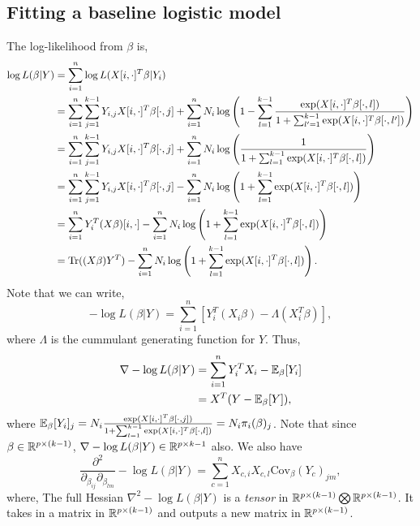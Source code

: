 \subsection{Fitting a baseline logistic model}
The log-likelihood from $\beta$ is,
\begin{align*}
    \log L(\beta|Y)&= \sum_{i=1}^n\log L(X[i,\cdot]^T\beta|Y_i)\\
    &=\sum_{i=1}^n \sum_{j=1}^{k-1} Y_{i,j}X[i,\cdot]^T\beta[\cdot,j]+\sum_{i=1}^n N_i\log\left(1- \sum_{l=1}^{k-1}\frac{\exp(X[i,\cdot]^T \beta[\cdot,l])}{1+\sum_{l'=1}^{k-1}\exp(X[i,\cdot]^T \beta[\cdot,l'])}\right)\\
    &=\sum_{i=1}^n \sum_{j=1}^{k-1} Y_{i,j}X[i,\cdot]^T\beta[\cdot,j]+\sum_{i=1}^n N_i\log\left(\frac{1}{1+\sum_{l=1}^{k-1}\exp(X[i,\cdot]^T \beta[\cdot,l])}\right)\\
    &=\sum_{i=1}^n \sum_{j=1}^{k-1} Y_{i,j}X[i,\cdot]^T\beta[\cdot,j]-\sum_{i=1}^n N_i\log\left({1+\sum_{l=1}^{k-1}\exp(X[i,\cdot]^T \beta[\cdot,l])}\right)\\
    &=\sum_{i=1}^n Y_i^T(X\beta)[i,\cdot]-\sum_{i=1}^n N_i\log\left({1+\sum_{l=1}^{k-1}\exp(X[i,\cdot]^T \beta[\cdot,l])}\right)\\
    &=\operatorname{Tr}((X\beta )Y^T)-\sum_{i=1}^n N_i\log\left({1+\sum_{l=1}^{k-1}\exp(X[i,\cdot]^T \beta[\cdot,l])}\right).
\end{align*}
Note that we can write,
\[-\log L(\beta|Y) = \sum_{i=1}^n \left[Y_i^T(X_i\beta) - \Lambda(X_i^T\beta)\right], \]
where $\Lambda$ is the cummulant generating function for $Y$. Thus,
\begin{align*}
    \nabla -\log L(\beta|Y) &= \sum_{i=1}^n Y_i^TX_i - {\mathbb{E}}_\beta[Y_i]\\
    &=X^T(Y-{\mathbb{E}}_\beta[Y]),
\end{align*}
where ${\mathbb{E}}_\beta[Y_i]_j = N_i\frac{\exp(X[i,\cdot]^T \beta[\cdot,j])}{1+\sum_{l=1}^{k-1}\exp(X[i,\cdot]^T \beta[\cdot,l])} = N_i\pi_i(\beta)_j$. Note that since $\beta \in {\mathbb R}^{p \times (k-1)}$, $\nabla - \log L(\beta|Y) \in {\mathbb R}^{p \times {k-1}}$ also. We also have
\[\frac{\partial^2}{\partial_{\beta_{ij}}\partial_{\beta_{lm}}}-\log L(\beta|Y) = \sum_{c=1}^n X_{c,i}X_{c,l}\text{Cov}_\beta(Y_c)_{jm}, \]
where,
The full Hessian $\nabla^2 - \log L(\beta|Y)$ is a \emph{tensor} in ${\mathbb R}^{p\times(k-1)} \bigotimes {\mathbb R}^{p \times (k-1)}$. It takes in a matrix in ${\mathbb R}^{p \times (k-1)}$ and outputs a new matrix in ${\mathbb R}^{p \times (k-1)}$.

